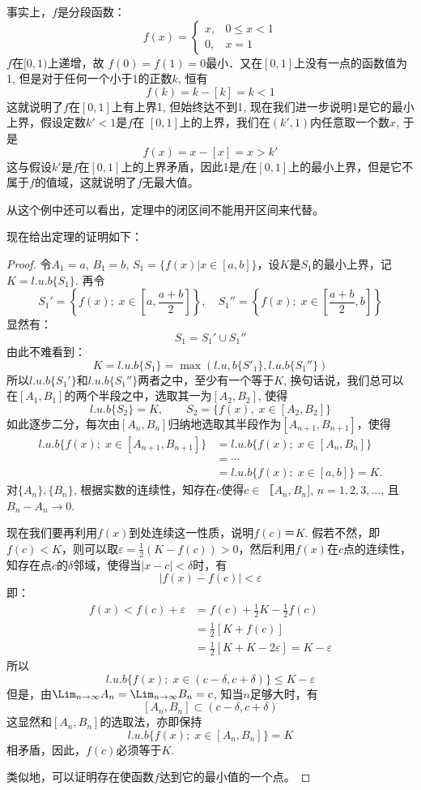 事实上，$f$是分段函数：
\[f(x)=\begin{cases}
    x,& 0\le x<1\\
    0,& x=1
\end{cases}\]
$f$在$[0, 1)$上递增，故
$f(0)=f(1)=0$最小．又在$[0, 1]$上没有一点的函数值为1, 但是对于任何一个小于1的正数$k$, 恒有
\[f (k) =k- [k] =k<1\]
这就说明了$f$在$[0, 1]$上有上界1, 但始终达不到1, 现在我们进一步说明1是它的最小上界，假设定数$k'<1$是$f$在
$[0, 1]$上的上界，我们在$(k',1)$内任意取一个数$x$, 于是
\[f (x) =x- [x] =x> k'\]
这与假设$k'$是$f$在$[0, 1]$上的上界矛盾，因此1是$f$在$[0, 1]$上的最小上界，但是它不属于$f$的值域，这就说明了$f$无最大值。

从这个例中还可以看出，定理中的闭区间不能用开区间来代替。

现在给出定理的证明如下：

\begin{proof}
令$A_1=a$, $B_1=b$, $S_1=\{f(x)|x\in [a,b]\}$，设$K$是$S_1$的最小上界，记$K=l.u.b\{S_1\}$. 再令
\[S_1'=\left\{f (x) ; \; x\in \left[a,\frac{a+b}{2}\right]\right\},\quad S_1''=\left\{f(x);\; x\in\left[\frac{a+b}{2},b\right]\right\}\]
显然有：
\[S_1=S_1'\cup S_1''\]
由此不难看到：
\[K=l.u.b \{S_1\} =\max \left(l.u,b \{S'_1\} ,l.u.b\{S_1''\}\right)\]
所以$l.u.b\{S_1'\}$和$l.u.b\{S_1''\}$两者之中，至少有一个等于$K$, 换句话说，我们总可以在$[A_1,B_1]$的两个半段之中，选取其一为$[A_2,B_2]$, 使得
\[l.u.b \{S_2\} =K,\qquad  S_2= \{f (x) ,\; x\in [A_2, B_2] \}\] 
如此逐步二分，每次由$[A_{n} ,B_{n}]$归纳地选取其半段作为$[A_{n+1} ,B_{n+1}]$，使得
\[\begin{split}
    l.u.b \{f (x) ;\; x\in  [A_{n+1}, B_{n+1}] \}&=l.u.b \{f (x) ;\; x\in [A_n, B_n] \}\\
&=\cdots\\
&=l.u.b \{f (x) ;\; x\in  [a,b] \}=K.
\end{split}\]
对$\{A_n\},\{B_n \}$, 根据实数的连续性，知存在$c$使得$c\in ［A_n,B_n]$, $n=1, 2, 3,\ldots$, 且$B_n-A_n\to 0$.

现在我们要再利用$f(x)$到处连续这一性质，说明$f(c)＝K$. 假若不然，即$f(c)<K$，则可以取$\varepsilon=\frac{1}{2}(K-f(c))>0$，然后利用$f(x)$在$c$点的连续性，知存在点$c$的$\delta$邻域，使得当$|x-c|<\delta$时，有
\[|f(x)-f(c)|<\varepsilon\]
即：
\[\begin{split}
    f(x)<f(c)+\varepsilon&=f(c)+\frac{1}{2}K-\frac{1}{2}f(c)\\
    &=\frac{1}{2}[K+f(c)]\\
    &=\frac{1}{2}[K+K-2\varepsilon]=K-\varepsilon
\end{split}\]
所以
\[l.u.b \{f (x) ;\; x\in  (c-\delta,c+\delta) \} \le K-\varepsilon\]
但是，由$\Lim_{n\to\infty} A_n=\Lim_{n\to\infty}B_n=c$, 知当$n$足够大时，有
\[[A_n,B_n]\subset (c-\delta,c+\delta)\]
这显然和$[A_n,B_n]$的选取法，亦即保持
\[l.u.b \{f (x) ;\; x\in [A_n,B_n]\}=K\]
相矛盾，因此，$f(c)$必须等于$K$. 

类似地，可以证明存在使函数$f$达到它的最小值的一个点。
\end{proof}

